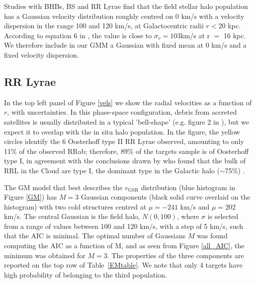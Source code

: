 \documentclass[useAMS,usenatbib]{mn2e}
\begin{document}
Studies with BHBs, BS and RR Lyrae \citep[e.g.][]{Xu08, Br10, Drake2013a} find that the field stellar halo population has a Gaussian velocity distribution roughly centred on 0 km/s with a velocity dispersion in the range 100 and 120 km/s, at Galactocentric radii $r < 20 $ kpc. According to equation 6 in \citet{Br10}, the value is close to $\sigma_{v}=103$km/s at r $=$ 16 kpc. We therefore include in our GMM a Gaussian with fixed mean at 0 km/s and a fixed velocity dispersion.
 

%
\subsection{RR Lyrae}

In the top left panel of Figure \ref{vels} we show the radial velocities as a function of $r$, with uncertainties. In this phase-space configuration, debris from accreted satellites is usually distributed in a typical 'bell-shape' (e.g. figure 2 in \citealt{Pop2017}), but we expect it to overlap with the in situ halo population. In the figure, the yellow circles identify the 6 Oosterhoff type II RR Lyrae observed, amounting to only 11\% of the observed RRab; therefore, 89\% of the targets sample is of Oosterhoff type I, in agreement with the conclusions drawn by \citet{Si14} who found that the bulk of RRL in the Cloud are type I, the dominant type in the Galactic halo ($\sim$75\%) . 

The GM model that best describes the $v_{\mathrm{GSR}}$ distribution (blue histogram in Figure \ref{GM}) has $M=3$ Gaussian components (black solid curve overlaid on the histogram) with two cold structures centred at $\mu = -241$ km/s and $\mu = 202$ km/s. The central Gaussian is the field halo, $N(0, 100)$, where $\sigma$ is selected from a range of values between 100 and 120 km/s, with a step of 5 km/s, such that the AIC is minimal. The optimal number of Gaussians $M$ was found computing the AIC as a function of M, and as seen from Figure \ref{all_AIC}, the minimum was obtained for $M=3$. The properties of the three components are reported on the top row of Table~\ref{EMtable}. We note that only 4 targets have high probability of belonging to the third population.  
\end{document}
